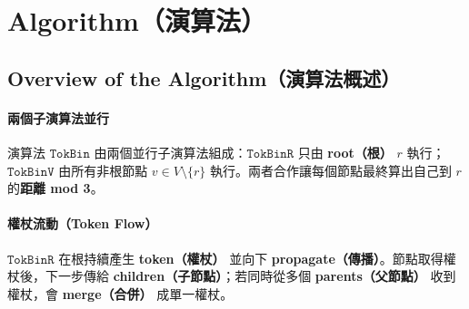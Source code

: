 \documentclass[a4paper, 12pt]{article}
\begin{document}




\section{Algorithm（演算法）}
\label{sec:algorithm}

\subsection{Overview of the Algorithm（演算法概述）}
\label{subsec:overview}

\paragraph{兩個子演算法並行}
演算法 \(\mathtt{TokBin}\) 由兩個並行子演算法組成：\(\mathtt{TokBinR}\) 只由 \textbf{root（根）} \(r\) 執行；\(\mathtt{TokBinV}\) 由所有非根節點 \(v\in V\setminus\{r\}\) 執行。兩者合作讓每個節點最終算出自己到 \(r\) 的\textbf{距離 mod 3}。

\paragraph{權杖流動（Token Flow）}
\(\mathtt{TokBinR}\) 在根持續產生 \textbf{token（權杖）} 並向下 \textbf{propagate（傳播）}。節點取得權杖後，下一步傳給 \textbf{children（子節點）}；若同時從多個 \textbf{parents（父節點）} 收到權杖，會 \textbf{merge（合併）} 成單一權杖。
\end{document}

